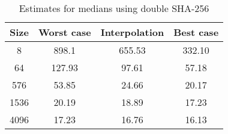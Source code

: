 \begin{table}
  \centering
  \begin{tabular}{ | c | c | c | c |}
    \hline
    \textbf{Size} & \textbf{Worst case} & \textbf{Interpolation} & \textbf{Best case} \\ \hline
    8    & 898.1  & 655.53  & 332.10 \\ \hline
    64   & 127.93 & 97.61  & 57.18 \\ \hline
    576  & 53.85  & 24.66  & 20.17 \\ \hline
    1536 & 20.19  & 18.89  & 17.23 \\ \hline
    4096 & 17.23  & 16.76  & 16.13 \\ \hline
  \end{tabular}
  \caption{Estimates for medians using double \ac{SHA}-256}
  \label{tbl:supercop:sha256d}
\end{table}
